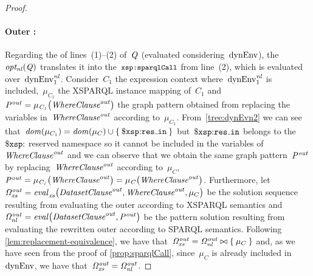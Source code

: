 \begin{proof}
  \paragraph*{Outer \SparqlForClause:} Regarding the \SparqlForClause of lines~(1)--(2) of~$\mathit{{Q}_{}}$ (evaluated
  considering~${\textrm{dynEnv}}$), the~$\mathit{opt_{nl}}\!\left(\mathit{{Q}_{}}\right)$ translates it into the~$\texttt{{\small \texttt{{\small xsp{:}}}sparqlCall}}$ from line~(2), which is
  evaluated over~$\mathrm{dynEnv}_{1}^{\mathit{nl}}$.
  Consider~$C_1$ the expression context where~$\mathrm{dynEnv}_{1}^{\mathit{nl}}$ is included,~$\mu_{C_1}$ the XSPARQL instance mapping
  of~$C_1$ and~${\mathit{P}}_{\mathit{}}^{\mathit{out}} = \mathit{\mu_{C_1}}\!\left({\mathit{{\textit{Whe\-re\-Clause}}}}_{\mathit{}}^{\mathit{out}}\right)$ the graph pattern obtained from replacing
  the variables in~${\mathit{{\textit{Whe\-re\-Clause}}}}_{\mathit{}}^{\mathit{out}}$ according to~$\mu_{C_1}$.
  From~\eqref{tree:dynEvn2} we can see that~$\funcCall{dom}{\mu_{C_1}} = \dom{\mu_{C}} \cup
  \set{\varR{res\mathunderscore{}in}}$ but~$\varR{res\mathunderscore{}in}$ belongs to the~$\$\mathtt{xsp{:}}$ reserved namespace
  so it cannot be included in the variables of ${\mathit{{\textit{Whe\-re\-Clause}}}}_{\mathit{}}^{\mathit{out}}$ and we can observe that we obtain the
  same graph pattern~${\mathit{P}}_{\mathit{}}^{\mathit{out}}$ by replacing~${\mathit{{\textit{Whe\-re\-Clause}}}}_{\mathit{}}^{\mathit{out}}$ according to~$\mu_C$,
  \ie~${\mathit{P}}_{\mathit{}}^{\mathit{out}} = \mathit{\mu_{C_1}}\!\left({\mathit{{\textit{Whe\-re\-Clause}}}}_{\mathit{}}^{\mathit{out}}\right) = \mathit{\mu_{C}}\!\left({\mathit{{\textit{Whe\-re\-Clause}}}}_{\mathit{}}^{\mathit{out}}\right)$.
  Furthermore, let~${\mathit{\Omega}}_{\mathit{xs}}^{\mathit{out}} = \mathit{{\mathit{eval}}_{\mathit{xs}}^{\mathit{}}}\!\left({\mathit{{\textit{Da\-ta\-set\-Clau\-se}}}}_{\mathit{}}^{\mathit{out}}, {\mathit{{\textit{Whe\-re\-Clause}}}}_{\mathit{}}^{\mathit{out}}, \mu_C\right)$ be the solution
  sequence resulting from evaluating the outer \SparqlForClause according to XSPARQL semantics and~${\mathit{\Omega}}_{\mathit{nl}}^{\mathit{out}} =
  \mathit{eval}\!\left({\mathit{{\textit{Da\-ta\-set\-Clau\-se}}}}_{\mathit{}}^{\mathit{out}}, {\mathit{P}}_{\mathit{}}^{\mathit{out}}\right)$ be the pattern solution resulting from evaluating the rewritten
  outer \SparqlForClause according to SPARQL semantics.
  Following \cref{lem:replacement-equivalence}, we have that~${\mathit{\Omega}}_{\mathit{xs}}^{\mathit{out}} = {\mathit{\Omega}}_{\mathit{nl}}^{\mathit{out}} \bowtie \left\{\:\mu_C\:\right\}$
  and, as we have seen from the proof of \cref{prop:sparqlCall}, since~$\mu_C$ is already included in~${\textrm{dynEnv}}$,
  we have that~${\mathit{\Omega}}_{\mathit{xs}}^{\mathit{out}} = {\mathit{\Omega}}_{\mathit{nl}}^{\mathit{out}}$.



\end{proof}
